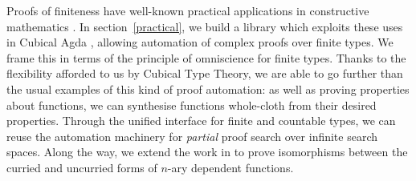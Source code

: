 \begin{refsection}
Proofs of finiteness have well-known practical applications in
constructive mathematics \cite{firsovDependentlyTypedProgramming2015}.
In section~\ref{practical}, we build a library which exploits these uses in
Cubical Agda \cite{vezzosiCubicalAgdaDependently2019}, allowing automation of
complex proofs over finite types.
We frame this in terms of the principle of omniscience for finite types.
Thanks to the flexibility afforded to us by Cubical Type Theory, we are able to
go further than the usual examples of this kind of proof automation: as well as
proving properties about functions, we can synthesise functions whole-cloth from
their desired properties.
Through the unified interface for finite and countable types, we can
reuse the automation machinery for \emph{partial} proof search over infinite
search spaces.
Along the way, we extend the work in \cite{allaisGenericLevelPolymorphic2019} to
prove isomorphisms between the curried and uncurried forms of \(n\)-ary
dependent functions.

\end{refsection}
